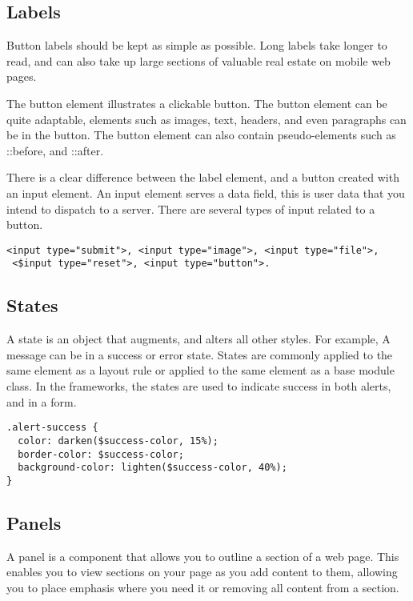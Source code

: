 \newpage
\subsection*{Labels}
Button labels should be kept as simple as possible. Long labels take longer to read, and can also take up large sections of valuable real estate on mobile web pages. 

The button element illustrates a clickable button. The button element can be quite adaptable, elements such as images, text, headers, and even paragraphs can be in the button. The button element can also contain pseudo-elements such as ::before, and ::after. 

There is a clear difference between the label element, and a button created with an input element. An input element serves a data field, this is user data that you intend to dispatch to a server. There are several types of input related to a button.

\begin{lstlisting}[language=CSS3]
 <input type="submit">, <input type="image">, <input type="file">, 
 <$input type="reset">, <input type="button">. 
\end{lstlisting}

\newpage
\subsection*{States}
A state is an object that augments, and alters all other styles. For example, A message can be in a success or error state. States are commonly applied to the same element as a layout rule or applied to the same element as a base module class. In the frameworks, the states are used to indicate success in both alerts, and in a form. 

\begin{lstlisting}[language=CSS3]
.alert-success {
  color: darken($success-color, 15%);
  border-color: $success-color;
  background-color: lighten($success-color, 40%);
}
\end{lstlisting}

\subsection*{Panels}
A panel is a component that allows you to outline a section of a web page. This enables you to view sections on your page as you add content to them, allowing you to place emphasis where you need it or removing all content from a section. 

